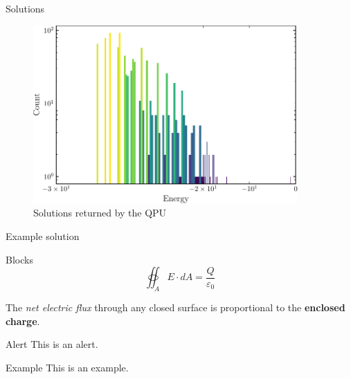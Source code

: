 \documentclass[handout]{beamer}
\begin{document}
\begin{frame}{Solutions}
    \begin{figure}
        \centering
        \includegraphics[width=0.9\textwidth]{../Figures/histogram.pdf}
        \caption{Solutions returned by the QPU}
    \end{figure}
\end{frame}

\begin{frame}{Example solution}

\end{frame}

\begin{frame}{Blocks}
    \begin{equation*}
        \oiint_A E\cdot dA=\frac{Q}{\varepsilon_0}
    \end{equation*}
    \pause
    \begin{block}{} %
        \centering
        The \emph{net electric flux} through any \alert{closed} surface is proportional to the \textbf{enclosed charge}.
    \end{block}

    \begin{alertblock}{Alert}
        This is an alert.
    \end{alertblock}

    \begin{exampleblock}{Example}
        This is an example.
    \end{exampleblock}
        
\end{frame}
\end{document}
